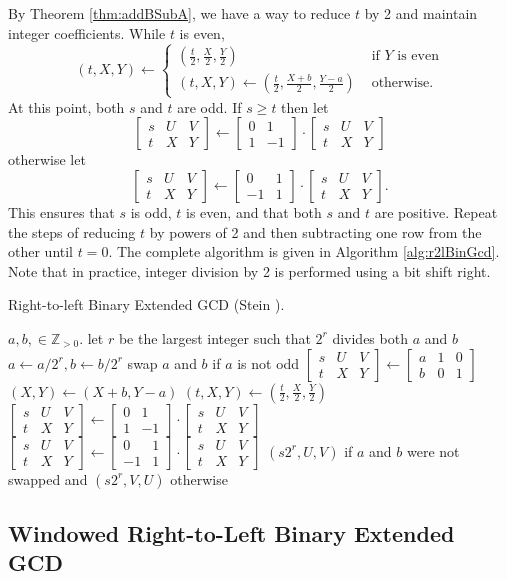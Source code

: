 \documentclass{ucalgthes1}
\theoremstyle{definition}
\newcommand{\ZZgtz}{\mathbb{Z}_{>0}}
\newcommand{\matrixtt}[4]{\left[ \begin{array}{rr} #1 & #2 \\ #3 & #4 \end{array} \right]}
\newcommand{\matrixThreeTwo}[6]{\left[ \begin{array}{rrr} #1 & #2 & #3 \\ #4 & #5 & #6 \end{array} \right]}
\begin{document}
By Theorem \ref{thm:addBSubA}, we have a way to reduce $t$ by 2 and maintain integer coefficients.  While $t$ is even, 
\[
	(t, X, Y) \gets \begin{cases}
		\left( \frac{t}{2}, \frac{X}{2}, \frac{Y}{2} \right) &
			\textrm{ if $Y$ is even} \\
		(t, X, Y) \gets \left( \frac{t}{2}, \frac{X+b}{2}, \frac{Y-a}{2} \right) & 
			\textrm{ otherwise.}
	\end{cases}
\]
At this point, both $s$ and $t$ are odd.  If $s \ge t$ then let
\[
	\matrixThreeTwo{s}{U}{V}{t}{X}{Y} \gets \matrixtt{0}{1}{1}{-1} \cdot \matrixThreeTwo{s}{U}{V}{t}{X}{Y}
\]
otherwise let
\[
	\matrixThreeTwo{s}{U}{V}{t}{X}{Y} \gets \matrixtt{0}{1}{-1}{1} \cdot \matrixThreeTwo{s}{U}{V}{t}{X}{Y}.
\]
This ensures that $s$ is odd, $t$ is even, and that both $s$ and $t$ are positive.  Repeat the steps of reducing $t$ by powers of 2 and then subtracting one row from the other until $t=0$.  The complete algorithm is given in Algorithm \ref{alg:r2lBinGcd}.  Note that in practice, integer division by 2 is performed using a bit shift right.


\begin{algorithm}[htb]
\caption{Right-to-left Binary Extended GCD (Stein \cite{Stein1967}).}
\label{alg:r2lBinGcd}
\begin{algorithmic}[1]
\Require $a,b, \in \ZZgtz$.
\State let $r$ be the largest integer such that $2^r$ divides both $a$ and $b$
\State $a \gets a / 2^r, b \gets b / 2^r$
\State swap $a$ and $b$ if $a$ is not odd
\State $\matrixThreeTwo{s}{U}{V}{t}{X}{Y} \gets \matrixThreeTwo{a}{1}{0}{b}{0}{1}$
			\State $(X, Y) \gets (X+b, Y-a)$
		\EndIf
		\State $(t, X, Y) \gets \left( \frac{t}{2}, \frac{X}{2}, \frac{Y}{2} \right)$
	\EndWhile
		\State $\matrixThreeTwo{s}{U}{V}{t}{X}{Y} \gets \matrixtt{0}{1}{1}{-1} \cdot \matrixThreeTwo{s}{U}{V}{t}{X}{Y}$
	\Else
		\State $\matrixThreeTwo{s}{U}{V}{t}{X}{Y} \gets \matrixtt{0}{1}{-1}{1} \cdot \matrixThreeTwo{s}{U}{V}{t}{X}{Y}$
	\EndIf
\EndWhile
\State \Return $(s2^r, U, V)$ if $a$ and $b$ were not swapped and $(s2^r, V, U)$ otherwise
\end{algorithmic}
\end{algorithm}


\subsection{Windowed Right-to-Left Binary Extended GCD}
\label{subsec:gcdR2LWindowed}
\end{document}
